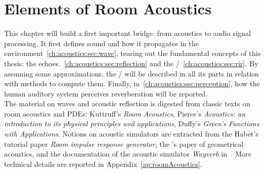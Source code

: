 \chapter{Elements of Room Acoustics}\label{chap:acoustics}
\vspace{-2.5em}
This chapter will build a first important bridge: from acoustics to audio signal processing.
It first defines sound and how it propagates in the environment~\cref{ch:acoustics:sec:wave}, teasing out the fundamental concepts of this thesis: the echoes.~\cref{ch:acoustics:sec:reflection} and the \RIRdef/~\cref{ch:acoustics:sec:rir}.
By assuming some approximations, the \RIR/ will be described in all its parts in relation with methods to compute them.
Finally, in~\cref{ch:acoustics:sec:perception}, how the human auditory system perceives reverberation will be reported.
\\The material on waves and acoustic reflection is digested from classic texts on room acoustics and PDEs:
Kuttruff’s \textit{Room Acoustics}, Pierce's \textit{Acoustics: an introduction to its physical principles and applications}, Duffy’s \textit{Green’s Functions with Applications}.
Notions on acoustic simulators are extracted from the Habet's tutorial paper \textit{Room impulse response generator},
the \citeauthor{savioja2015overview}'s paper of geometrical acoustics, and the documentation of the acoustic simulator \textit{Wayverb} in~.
More technical details are reported in Appendix~\ref{ap:roomAcoustics}.

